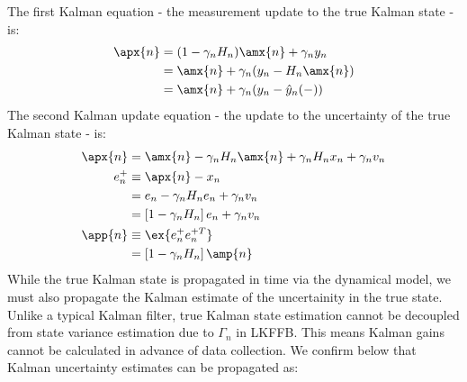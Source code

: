 The first Kalman equation - the measurement update to the true Kalman state - is:
\begin{align}
\apx{n} &= (1 - \gamma_nH_n) \amx{n} + \gamma_ny_n \\
& =  \amx{n} + \gamma_n(y_n - H_n\amx{n}) \\
&= \amx{n} + \gamma_n (y_n - \hat{y}_n(-)) \label{eqn:KF_update_x+} 
\end{align}
 The second Kalman update equation - the  update to the uncertainty of the true Kalman state - is:
\begin{align}
\apx{n} &=  \amx{n} - \gamma_nH_n \amx{n} + \gamma_nH_n x_n + \gamma_nv_n  \\
e^{+}_n &\equiv \apx{n} - x_n \\
 &=  e_n - \gamma_nH_n e_n + \gamma_nv_n \\
& = \left[1 - \gamma_nH_n \right] e_n + \gamma_nv_n  \\
\app{n} &\equiv \ex{e_n^+ e_n^{+T}} \\
&= \left[1  - \gamma_n H_n \right] \amp{n} \label{eqn:KF_update_p+}
\end{align}
While the true Kalman state is propagated in time via the dynamical model, we must also propagate the Kalman estimate of the uncertainity in the true state. Unlike a typical Kalman filter, true Kalman state estimation cannot be decoupled from state variance estimation due to $\Gamma_n$ in LKFFB. This means Kalman gains cannot be calculated in advance of data collection. We confirm below that Kalman uncertainty estimates can be propagated as:
